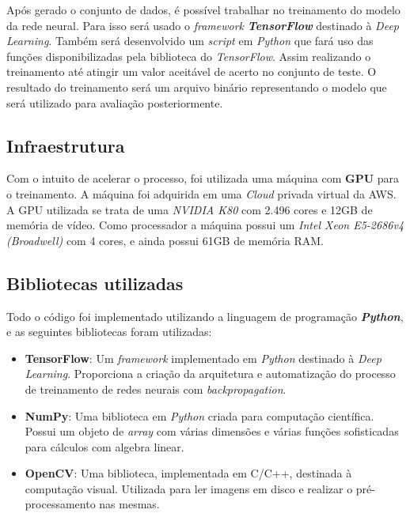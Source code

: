 Após gerado o conjunto de dados, é possível trabalhar no treinamento
do modelo da rede neural. Para isso será usado o \textit{framework}
{\bf \emph{TensorFlow}}\cite{TensorFlow} destinado à \textit{Deep
  Learning}. Também será desenvolvido um \textit{script} em
\textit{Python} que fará uso das funções disponibilizadas pela
biblioteca do \textit{TensorFlow}. Assim realizando o treinamento até
atingir um valor aceitável de acerto no conjunto de teste. O resultado
do treinamento será um arquivo binário representando o modelo que será
utilizado para avaliação posteriormente.

\subsection{Infraestrutura}

Com o intuito de acelerar o processo, foi utilizada uma
máquina com {\bf GPU} para o treinamento. A máquina foi adquirida em
uma \textit{Cloud} privada virtual da AWS\cite{GPUinstance}. A GPU
utilizada se trata de uma \textit{NVIDIA K80} com 2.496 cores e 12GB
de memória de vídeo. Como processador a máquina possui um
\textit{Intel Xeon E5-2686v4 (Broadwell)} com 4 cores, e ainda
possui 61GB de memória RAM.

\subsection{Bibliotecas utilizadas}

Todo o código foi implementado utilizando a linguagem de programação
{\bf \emph{Python}}, e as seguintes bibliotecas foram utilizadas:

\begin{itemize}

\item {\bf TensorFlow}\cite{TensorFlow}: Um \textit{framework}
  implementado em \textit{Python} destinado à \textit{Deep
    Learning}. Proporciona a criação da arquitetura e automatização do
  processo de treinamento de redes neurais com
  \textit{backpropagation}.

\item {\bf NumPy}\cite{NumPy}: Uma biblioteca em \textit{Python}
  criada para computação científica. Possui um objeto de
  \textit{array} com várias dimensões e várias funções sofisticadas
  para cálculos com algebra linear.

\item {\bf OpenCV}\cite{OpenCV}: Uma biblioteca, implementada em
  C/C++, destinada à computação visual. Utilizada para ler imagens em
  disco e realizar o pré-processamento nas mesmas.

\end{itemize}

